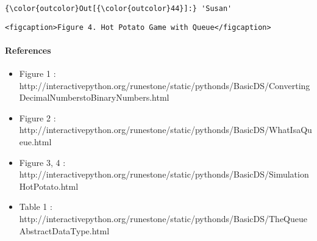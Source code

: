 \documentclass[11pt]{article}
\begin{document}
\begin{Verbatim}[commandchars=\\\{\}]
{\color{outcolor}Out[{\color{outcolor}44}]:} 'Susan'
\end{Verbatim}
            
    \begin{verbatim}
<figcaption>Figure 4. Hot Potato Game with Queue</figcaption>
\end{verbatim}

    \paragraph{References}\label{references}

\begin{itemize}
\item
  Figure 1 :
  http://interactivepython.org/runestone/static/pythonds/BasicDS/ConvertingDecimalNumberstoBinaryNumbers.html
\item
  Figure 2 :
  http://interactivepython.org/runestone/static/pythonds/BasicDS/WhatIsaQueue.html
\item
  Figure 3, 4 :
  http://interactivepython.org/runestone/static/pythonds/BasicDS/SimulationHotPotato.html
\item
  Table 1 :
  http://interactivepython.org/runestone/static/pythonds/BasicDS/TheQueueAbstractDataType.html
\end{itemize}


    
    
    
    
\end{document}
